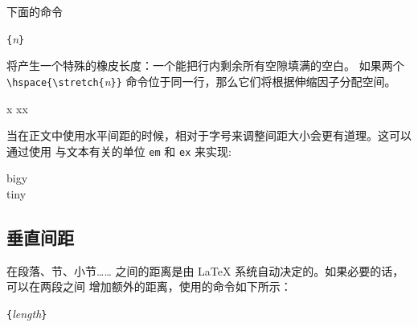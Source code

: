 \label{cmd:stretch}
下面的命令
\begin{lscommand}
\verb|{|\emph{n}\verb|}|
\end{lscommand}
\noindent 将产生一个特殊的橡皮长度：一个能把行内剩余所有空隙填满的空白。
如果两个 \verb|\hspace{\stretch{|\emph{n}\verb|}}| 命令位于同一行，那么它们将根据伸缩因子分配空间。

\begin{example}
x
xx
\end{example}

当在正文中使用水平间距的时候，相对于字号来调整间距大小会更有道理。这可以通过使用
与文本有关的单位 \texttt{em} 和 \texttt{ex} 来实现:
\begin{example}
{\Large{}big\hspace{1em}y}\\
{\tiny{}tin\hspace{1em}y}
\end{example}

\subsection{垂直间距}
在段落、节、小节…… 之间的距离是由 \LaTeX{} 系统自动决定的。如果必要的话，可以在两段之间
增加额外的距离，使用的命令如下所示：
\begin{lscommand}
\verb|{|\emph{length}\verb|}|
\end{lscommand}

